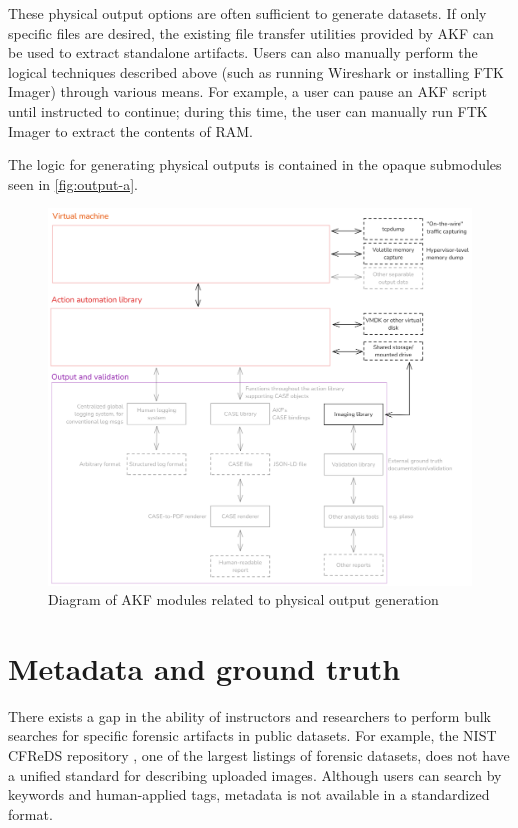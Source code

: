 \documentclass[letterpaper,12pt]{report}
\begin{document}
These physical output options are often sufficient to generate datasets.
If only specific files are desired, the existing file transfer utilities
provided by AKF can be used to extract standalone artifacts. Users can
also manually perform the logical techniques described above (such as
running Wireshark or installing FTK Imager) through various means. For
example, a user can pause an AKF script until instructed to continue;
during this time, the user can manually run FTK Imager to extract the
contents of RAM.

The logic for generating physical outputs is contained in the opaque
submodules seen in \autoref{fig:output-a}.

\begin{figure}[h]
\centering
\includegraphics[width=1\linewidth]{output-and-validation-a.png}
\caption{Diagram of AKF modules related to physical output
generation}\label{fig:output-a}
\end{figure}

\section{Metadata and ground
truth}\label{metadata-and-ground-truth}

There exists a gap in the ability of instructors and researchers to
perform bulk searches for specific forensic artifacts in public
datasets. For example, the NIST CFReDS repository
\cite{nationalinstituteofstandardsandtechnologyCFReDSPortal}, one of
the largest listings of forensic datasets, does not have a unified
standard for describing uploaded images. Although users can search by
keywords and human-applied tags, metadata is not available in a
standardized format.
\end{document}

